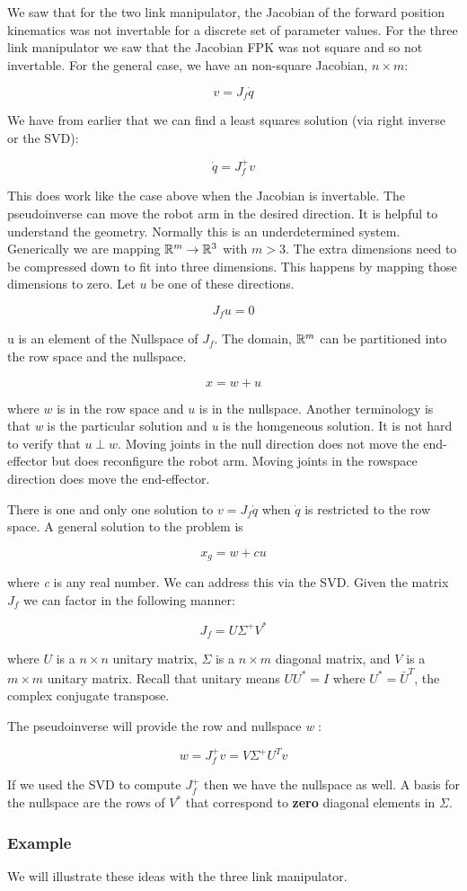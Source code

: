 We saw that for the two link manipulator, the Jacobian of the forward
position kinematics was not invertable for a discrete set of parameter
values. For the three link manipulator we saw that the Jacobian FPK was
not square and so not invertable. For the general case, we have an
non-square Jacobian, \(n \times m\):

\[v = J_f \dot{q}\]

We have from earlier that we can find a least squares solution (via
right inverse or the SVD):

\[\dot{q} = J_f^+ v\]

This does work like the case above when the Jacobian is invertable. The
pseudoinverse can move the robot arm in the desired direction. It is
helpful to understand the geometry. Normally this is an underdetermined
system. Generically we are mapping \({\Bbb R}^m \to {\Bbb R}^3\) with
\(m > 3\). The extra dimensions need to be compressed down to fit into
three dimensions. This happens by mapping those dimensions to zero. Let
\(u\) be one of these directions.

\[J_f u = 0\]

u is an element of the Nullspace of \(J_f\). The domain, \({\Bbb R}^m\)
can be partitioned into the row space and the nullspace.

\[x = w + u\]

where \(w\) is in the row space and \(u\) is in the nullspace. Another
terminology is that \emph{w} is the particular solution and \emph{u} is
the homgeneous solution. It is not hard to verify that \(u \perp w\).
Moving joints in the null direction does not move the end-effector but
does reconfigure the robot arm. Moving joints in the rowspace direction
does move the end-effector.

There is one and only one solution to \(v = J_f \dot{q}\) when
\(\dot{q}\) is restricted to the row space. A general solution to the
problem is

\[x_g = w + cu\]

where \emph{c} is any real number. We can address this via the SVD.
Given the matrix \(J_f\) we can factor in the following manner:

\[J_f  = U \Sigma^+ V^*\]

where \(U\) is a \(n \times n\) unitary matrix, \(\Sigma\) is a
\(n \times m\) diagonal matrix, and \(V\) is a \(m \times m\) unitary
matrix. Recall that unitary means \(UU^* = I\) where
\(U^* = \bar{U}^T\), the complex conjugate transpose.

The pseudoinverse will provide the row and nullspace \emph{w} :

\[w = J_f^+ v = V \Sigma^+ U^T v\]

If we used the SVD to compute \(J_f^+\) then we have the nullspace as
well. A basis for the nullspace are the rows of \(V^*\) that correspond
to \textbf{zero} diagonal elements in \(\Sigma\).

\hypertarget{example-1}{%
\subsubsection{Example}\label{example-1}}

We will illustrate these ideas with the three link manipulator.
